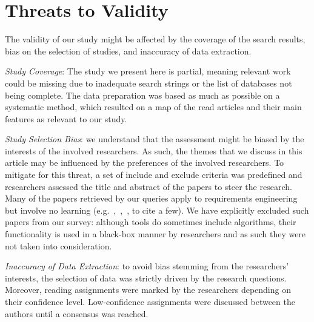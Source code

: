 \section{Threats to Validity}
\label{sec:threats_to_validity}

The validity of our study might be affected by the coverage of the search
results, bias on the selection of studies, and inaccuracy of data extraction.

\emph{Study Coverage}: The study we present here is partial, meaning
relevant work could be missing due to inadequate search strings or
the list of databases not being complete. The data preparation was based as
much as possible on a systematic method, which resulted on a map of the read
articles and their main features as relevant to our study.

\emph{Study Selection Bias}: we understand that the assessment might be biased
by the interests of the involved researchers. As such, the themes that we discuss
in this article may be influenced by the preferences of the involved
researchers. To mitigate for this threat, a set of include and exclude criteria
was predefined and researchers assessed the title and abstract of the papers to
steer the research. Many of the papers retrieved by our queries apply \NLP
to requirements engineering but involve no learning
(e.g.~\cite{Xiao:2012},~\cite{Deeptimahanti:2011},~\cite{ChengHeLiangLi:2010},
to cite a few). We have explicitly excluded such papers from our survey:
although \NLP tools do sometimes include \ML algorithms, their functionality is
used in a black-box manner by \RE researchers and as such they were not taken
into consideration.

\emph{Inaccuracy of Data Extraction}: to avoid bias stemming from the
researchers' interests, the selection of data was strictly driven by the
research questions. Moreover, reading assignments were marked by the researchers
depending on their confidence level. Low-confidence assignments were discussed
between the authors until a consensus was reached.